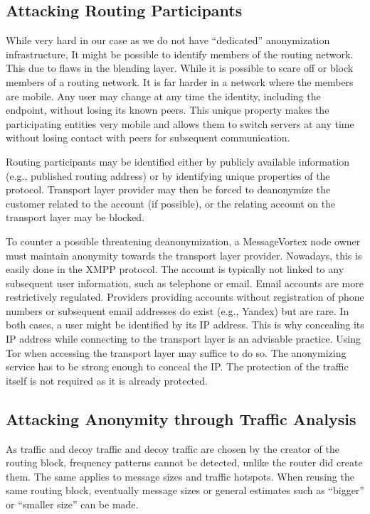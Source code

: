 \subsection{Attacking Routing Participants}
While very hard in our case as we do not have ``dedicated'' anonymization infrastructure, It might be possible to identify members of the routing network. This due to flaws in the blending layer. While it is possible to scare off or block members of a routing network. It is far harder in a network where the members are mobile. Any user may change at any time the identity, including the endpoint, without losing its known peers. This unique property makes the participating entities very mobile and allows them to switch servers at any time without losing contact with peers for subsequent communication.

Routing participants may be identified either by publicly available information (e.g., published routing address) or by identifying unique properties of the protocol. Transport layer provider may then be forced to deanonymize the customer related to the account (if possible), or the relating account on the transport layer may be blocked. 

To counter a possible threatening deanonymization, a MessageVortex node owner must maintain anonymity towards the transport layer provider. Nowadays, this is easily done in the XMPP protocol. The account is typically not linked to any subsequent user information, such as telephone or email. Email accounts are more restrictively regulated. Providers providing accounts without registration of phone numbers or subsequent email addresses do exist (e.g., Yandex) but are rare. In both cases, a user might be identified by its IP address. This is why concealing its IP address while connecting to the transport layer is an advisable practice. Using Tor when accessing the transport layer may suffice to do so. The anonymizing service has to be strong enough to conceal the IP. The protection of the traffic itself is not required as it is already protected.

\subsection{Attacking Anonymity through Traffic Analysis}
As traffic and decoy traffic and decoy traffic are chosen by the creator of the routing block, frequency patterns cannot be detected, unlike the router did create them. The same applies to message sizes and traffic hotspots. When reusing the same routing block, eventually message sizes or general estimates such as ``bigger'' or ``smaller size'' can be made.

